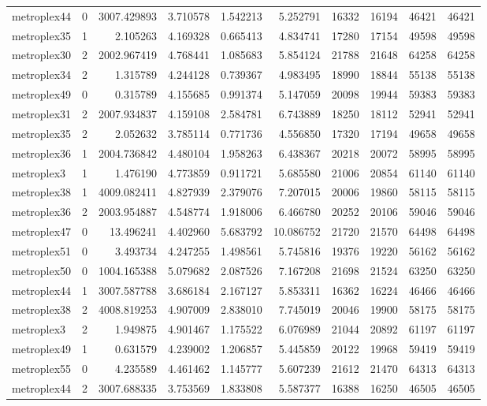 \begin{longtable}{|l|r|r|r|r|r|r|r|r|r|}
metroplex44 & 0 & 3007.429893 & 3.710578 & 1.542213 & 5.252791 & 16332 & 16194 & 46421 & 46421 \\
metroplex35 & 1 & 2.105263 & 4.169328 & 0.665413 & 4.834741 & 17280 & 17154 & 49598 & 49598 \\
metroplex30 & 2 & 2002.967419 & 4.768441 & 1.085683 & 5.854124 & 21788 & 21648 & 64258 & 64258 \\
metroplex34 & 2 & 1.315789 & 4.244128 & 0.739367 & 4.983495 & 18990 & 18844 & 55138 & 55138 \\
metroplex49 & 0 & 0.315789 & 4.155685 & 0.991374 & 5.147059 & 20098 & 19944 & 59383 & 59383 \\
metroplex31 & 2 & 2007.934837 & 4.159108 & 2.584781 & 6.743889 & 18250 & 18112 & 52941 & 52941 \\
metroplex35 & 2 & 2.052632 & 3.785114 & 0.771736 & 4.556850 & 17320 & 17194 & 49658 & 49658 \\
metroplex36 & 1 & 2004.736842 & 4.480104 & 1.958263 & 6.438367 & 20218 & 20072 & 58995 & 58995 \\
metroplex3 & 1 & 1.476190 & 4.773859 & 0.911721 & 5.685580 & 21006 & 20854 & 61140 & 61140 \\
metroplex38 & 1 & 4009.082411 & 4.827939 & 2.379076 & 7.207015 & 20006 & 19860 & 58115 & 58115 \\
metroplex36 & 2 & 2003.954887 & 4.548774 & 1.918006 & 6.466780 & 20252 & 20106 & 59046 & 59046 \\
metroplex47 & 0 & 13.496241 & 4.402960 & 5.683792 & 10.086752 & 21720 & 21570 & 64498 & 64498 \\
metroplex51 & 0 & 3.493734 & 4.247255 & 1.498561 & 5.745816 & 19376 & 19220 & 56162 & 56162 \\
metroplex50 & 0 & 1004.165388 & 5.079682 & 2.087526 & 7.167208 & 21698 & 21524 & 63250 & 63250 \\
metroplex44 & 1 & 3007.587788 & 3.686184 & 2.167127 & 5.853311 & 16362 & 16224 & 46466 & 46466 \\
metroplex38 & 2 & 4008.819253 & 4.907009 & 2.838010 & 7.745019 & 20046 & 19900 & 58175 & 58175 \\
metroplex3 & 2 & 1.949875 & 4.901467 & 1.175522 & 6.076989 & 21044 & 20892 & 61197 & 61197 \\
metroplex49 & 1 & 0.631579 & 4.239002 & 1.206857 & 5.445859 & 20122 & 19968 & 59419 & 59419 \\
metroplex55 & 0 & 4.235589 & 4.461462 & 1.145777 & 5.607239 & 21612 & 21470 & 64313 & 64313 \\
metroplex44 & 2 & 3007.688335 & 3.753569 & 1.833808 & 5.587377 & 16388 & 16250 & 46505 & 46505 \\

\end{longtable}
